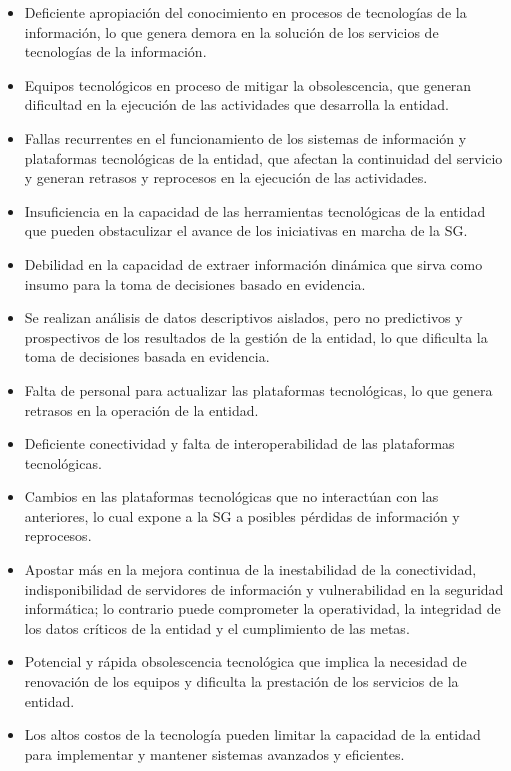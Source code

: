 \documentclass[
	a4paper, %
	12pt, %
]{include/CSSullivanBusinessReport}
\def\tightlist{}
\begin{document}
\begin{itemize}
\tightlist
\item
  Deficiente apropiación del conocimiento en procesos de tecnologías de
  la información, lo que genera demora en la solución de los servicios
  de tecnologías de la información.
\item
  Equipos tecnológicos en proceso de mitigar la obsolescencia, que
  generan dificultad en la ejecución de las actividades que desarrolla
  la entidad.
\item
  Fallas recurrentes en el funcionamiento de los sistemas de información
  y plataformas tecnológicas de la entidad, que afectan la continuidad
  del servicio y generan retrasos y reprocesos en la ejecución de las
  actividades.
\item
  Insuficiencia en la capacidad de las herramientas tecnológicas de la
  entidad que pueden obstaculizar el avance de los iniciativas en marcha
  de la SG.
\item
  Debilidad en la capacidad de extraer información dinámica que sirva
  como insumo para la toma de decisiones basado en evidencia.
\item
  Se realizan análisis de datos descriptivos aislados, pero no
  predictivos y prospectivos de los resultados de la gestión de la
  entidad, lo que dificulta la toma de decisiones basada en evidencia.
\item
  Falta de personal para actualizar las plataformas tecnológicas, lo que
  genera retrasos en la operación de la entidad.
\item
  Deficiente conectividad y falta de interoperabilidad de las
  plataformas tecnológicas.
\item
  Cambios en las plataformas tecnológicas que no interactúan con las
  anteriores, lo cual expone a la SG a posibles pérdidas de información
  y reprocesos.
\item
  Apostar más en la mejora continua de la inestabilidad de la
  conectividad, indisponibilidad de servidores de información y
  vulnerabilidad en la seguridad informática; lo contrario puede
  comprometer la operatividad, la integridad de los datos críticos de la
  entidad y el cumplimiento de las metas.
\item
  Potencial y rápida obsolescencia tecnológica que implica la necesidad
  de renovación de los equipos y dificulta la prestación de los
  servicios de la entidad.
\item
  Los altos costos de la tecnología pueden limitar la capacidad de la
  entidad para implementar y mantener sistemas avanzados y eficientes.
\end{itemize}
\end{document}

